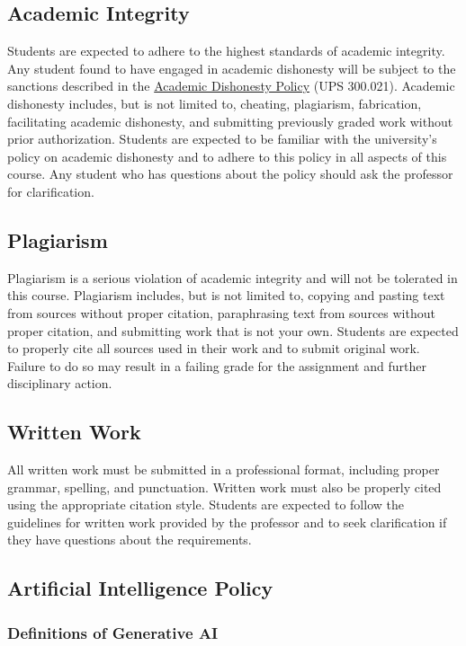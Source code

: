 \documentclass[11pt, letterpaper]{article}
\begin{document}
\subsection*{Academic Integrity}
Students are expected to adhere to the highest standards of academic integrity. Any student found to have engaged in academic dishonesty will be subject to the sanctions described in the \href{https://www.fullerton.edu/senate/publications_policies_resolutions/ups/UPS%20300/UPS%20300.021.pdf}{Academic Dishonesty Policy} (UPS 300.021). Academic dishonesty includes, but is not limited to, cheating, plagiarism, fabrication, facilitating academic dishonesty, and submitting previously graded work without prior authorization. Students are expected to be familiar with the university's policy on academic dishonesty and to adhere to this policy in all aspects of this course. Any student who has questions about the policy should ask the professor for clarification.

\subsection*{Plagiarism}
Plagiarism is a serious violation of academic integrity and will not be tolerated in this course. Plagiarism includes, but is not limited to, copying and pasting text from sources without proper citation, paraphrasing text from sources without proper citation, and submitting work that is not your own. Students are expected to properly cite all sources used in their work and to submit original work. Failure to do so may result in a failing grade for the assignment and further disciplinary action.

\subsection*{Written Work}
All written work must be submitted in a professional format, including proper grammar, spelling, and punctuation. Written work must also be properly cited using the appropriate citation style. Students are expected to follow the guidelines for written work provided by the professor and to seek clarification if they have questions about the requirements.

\subsection*{Artificial Intelligence Policy}
\subsubsection*{Definitions of Generative AI}
\end{document}
